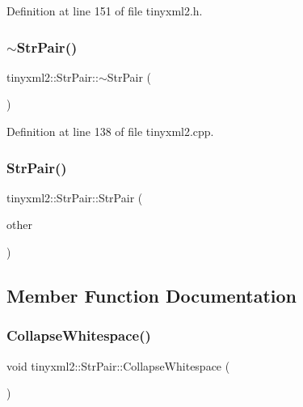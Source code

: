 Definition at line 151 of file tinyxml2.\+h.

\mbox{\label{classtinyxml2_1_1_str_pair_a60bed84d2503296e1c2a73fcef1431f9}} 
\subsubsection{$\sim$\+Str\+Pair()}
{\footnotesize\ttfamily tinyxml2\+::\+Str\+Pair\+::$\sim$\+Str\+Pair (\begin{DoxyParamCaption}{ }\end{DoxyParamCaption})}



Definition at line 138 of file tinyxml2.\+cpp.

\mbox{\label{classtinyxml2_1_1_str_pair_ac43c1f4a5730c5582f9cff724376d106}} 
\subsubsection{Str\+Pair()\hspace{0.1cm}{\footnotesize\ttfamily [2/2]}}
{\footnotesize\ttfamily tinyxml2\+::\+Str\+Pair\+::\+Str\+Pair (\begin{DoxyParamCaption}\item[{const \textbf{ Str\+Pair} \&}]{other }\end{DoxyParamCaption})\hspace{0.3cm}{\ttfamily [private]}}



\subsection{Member Function Documentation}
\mbox{\label{classtinyxml2_1_1_str_pair_ade1469025e6b4cac74397a82a7429337}} 
\subsubsection{Collapse\+Whitespace()}
{\footnotesize\ttfamily void tinyxml2\+::\+Str\+Pair\+::\+Collapse\+Whitespace (\begin{DoxyParamCaption}{ }\end{DoxyParamCaption})\hspace{0.3cm}{\ttfamily [private]}}



